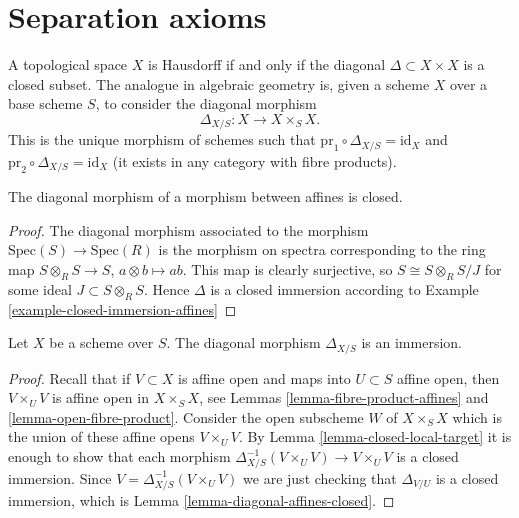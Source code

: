 \section{Separation axioms}
\label{section-speration-axioms}

\noindent
A topological space $X$ is Hausdorff if and only if the
diagonal $\Delta \subset X \times X$ is a closed subset.
The analogue in algebraic geometry is, given a scheme $X$ over
a base scheme $S$, to consider the
diagonal morphism
$$
\Delta_{X/S} : X \longrightarrow X \times_S X.
$$
This is the unique morphism of schemes such that
$\text{pr}_1 \circ \Delta_{X/S} = \text{id}_X$ and 
$\text{pr}_2 \circ \Delta_{X/S} = \text{id}_X$ (it exists in
any category with fibre products).

\begin{lemma}
\label{lemma-diagonal-affines-closed}
The diagonal morphism of a morphism between affines is closed.
\end{lemma}

\begin{proof}
The diagonal morphism associated to the morphism
$\text{Spec}(S) \to \text{Spec}(R)$ is the morphism on spectra
corresponding to the ring
map $S \otimes_R S \to S$, $a \otimes b \mapsto ab$.
This map is clearly surjective, so $S \cong S\otimes_R S/J$
for some ideal $J \subset S \otimes_R S$. Hence
$\Delta$ is a closed immersion according to
Example \ref{example-closed-immersion-affines}
\end{proof}

\begin{lemma}
\label{lemma-diagonal-immersion}
Let $X$ be a scheme over $S$.
The diagonal morphism $\Delta_{X/S}$ is an immersion.
\end{lemma}

\begin{proof}
Recall that if $V \subset X$ is affine open and maps into
$U \subset S$ affine open, then $V \times_U V$ is affine open
in $X \times_S X$, see Lemmas \ref{lemma-fibre-product-affines}
and \ref{lemma-open-fibre-product}.
Consider the open subscheme $W$ of $X \times_S X$ which
is the union of these affine opens $V \times_U V$.
By Lemma \ref{lemma-closed-local-target} it is enough
to show that each morphism
$\Delta_{X/S}^{-1}(V \times_U V) \to V \times_U V$ is
a closed immersion. Since $V = \Delta_{X/S}^{-1}(V \times_U V)$
we are just checking that $\Delta_{V/U}$ is a closed
immersion, which is Lemma \ref{lemma-diagonal-affines-closed}.
\end{proof}

